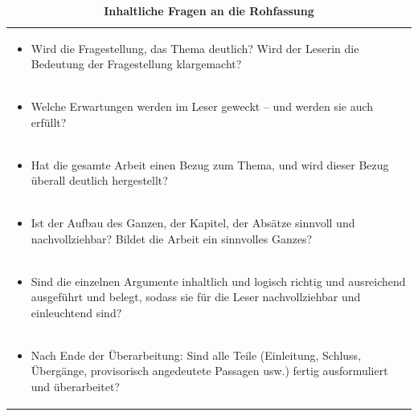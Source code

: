 \documentclass[]{book}
\providecommand{\tightlist}{%
  \setlength{\itemsep}{0pt}\setlength{\parskip}{0pt}}
\theoremstyle{definition}
\theoremstyle{definition}
\theoremstyle{definition}
\theoremstyle{remark}
\begin{document}
\begin{longtable}[]{@{}l@{}}
\caption{\textbf{\label{tab:rohfassung2} Inhaltliche Fragen an die
Rohfassung}}\tabularnewline
\toprule
\begin{minipage}[t]{0.97\columnwidth}\raggedright\strut
\begin{itemize}
\tightlist
\item
  Wird die Fragestellung, das Thema deutlich? Wird der Leserin die
  Bedeutung der Fragestellung klargemacht? \vspace{-6mm}
\end{itemize}\strut
\end{minipage}\tabularnewline
\begin{minipage}[t]{0.97\columnwidth}\raggedright\strut
\begin{itemize}
\tightlist
\item
  Welche Erwartungen werden im Leser geweckt -- und werden sie auch
  erfüllt? \vspace{-6mm}
\end{itemize}\strut
\end{minipage}\tabularnewline
\begin{minipage}[t]{0.97\columnwidth}\raggedright\strut
\begin{itemize}
\tightlist
\item
  Hat die gesamte Arbeit einen Bezug zum Thema, und wird dieser Bezug
  überall deutlich hergestellt? \vspace{-6mm}
\end{itemize}\strut
\end{minipage}\tabularnewline
\begin{minipage}[t]{0.97\columnwidth}\raggedright\strut
\begin{itemize}
\tightlist
\item
  Ist der Aufbau des Ganzen, der Kapitel, der Absätze sinnvoll und
  nachvollziehbar? Bildet die Arbeit ein sinnvolles Ganzes?
  \vspace{-6mm}
\end{itemize}\strut
\end{minipage}\tabularnewline
\begin{minipage}[t]{0.97\columnwidth}\raggedright\strut
\begin{itemize}
\tightlist
\item
  Sind die einzelnen Argumente inhaltlich und logisch richtig und
  ausreichend ausgeführt und belegt, sodass sie für die Leser
  nachvollziehbar und einleuchtend sind? \vspace{-6mm}
\end{itemize}\strut
\end{minipage}\tabularnewline
\begin{minipage}[t]{0.97\columnwidth}\raggedright\strut
\begin{itemize}
\tightlist
\item
  Nach Ende der Überarbeitung: Sind alle Teile (Einleitung, Schluss,
  Übergänge, provisorisch angedeutete Passagen usw.) fertig
  ausformuliert und überarbeitet?
\end{itemize}\strut
\end{minipage}\tabularnewline
\bottomrule
\end{longtable}
\end{document}
